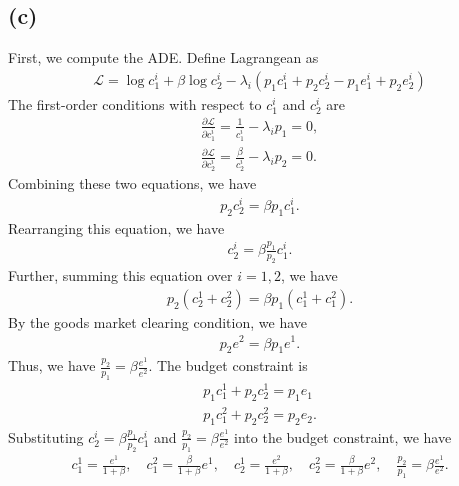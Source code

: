 \documentclass[a4paper]{article}
\begin{document}
\subsection*{(c)}
First, we compute the ADE. Define Lagrangean as
\begin{gather*}
    \mathcal{L} = \log c_1^i + \beta \log c_2^i - \lambda_i (p_1 c_1^i + p_2 c_2^i - p_1 e_1^i + p_2 e_2^i)
\end{gather*}
The first-order conditions with respect to $c_1^i$ and $c_2^i$ are
\begin{gather*}
    \frac{\partial \mathcal{L}}{\partial c_1^i} = \frac{1}{c_1^i} - \lambda_i p_1 = 0, \\
    \frac{\partial \mathcal{L}}{\partial c_2^i} = \frac{\beta}{c_2^i} - \lambda_i p_2 = 0.
\end{gather*}
Combining these two equations, we have
\begin{gather*}
    p_2 c_2^i = \beta p_1 c_1^i.
\end{gather*}
Rearranging this equation, we have
\begin{gather*}
    c_2^i = \beta \frac{p_1}{p_2} c_1^i.
\end{gather*}
Further, summing this equation over $i=1,2$, we have
\begin{gather*}
    p_2 (c_2^1 + c_2^2) = \beta p_1 (c_1^1 + c_1^2).
\end{gather*}
By the goods market clearing condition, we have
\begin{gather*}
    p_2 e^2 = \beta p_1 e^1.
\end{gather*}
Thus, we have $\frac{p_2}{p_1} = \beta \frac{e^1}{e^2}$. The budget constraint is 
\begin{gather*}
    p_1 c_1^1 + p_2 c_2^1 = p_1 e_1\\
    p_1 c_1^2 + p_2 c_2^2 = p_2 e_2.
\end{gather*}
Substituting $c_2^i = \beta \frac{p_1}{p_2} c_1^i$ and $\frac{p_2}{p_1} = \beta \frac{e^1}{e^2}$ into the budget constraint, we have
\begin{gather*}
    c_1^1 = \frac{e^1}{1 + \beta}, \quad c_1^2 = \frac{\beta}{1 + \beta}e^1,  \quad c_2^1 = \frac{e^2}{1 + \beta}, \quad c_2^2 = \frac{\beta}{1 + \beta}e^2, \quad \frac{p_2}{p_1} = \beta \frac{e^1}{e^2}. 
\end{gather*}
\end{document}
